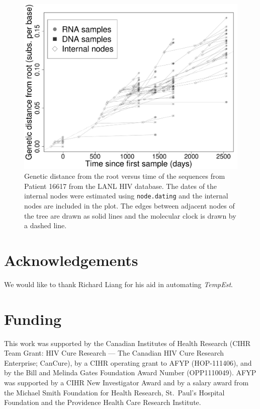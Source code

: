 \documentclass{bioinfo}
\newcommand{\code}[1]{{\tt #1}}
\begin{document}
\begin{figure}[t]
	\centering
	\includegraphics[width=\columnwidth]{Patient_16617_gray}
	\caption[Genetic distance versus time plot]{Genetic distance from the root versus time of the sequences from Patient 16617 from the LANL HIV database. The dates of the internal nodes were estimated using \code{node.dating} and the internal nodes are included in the plot. The edges between adjacent nodes of the tree are drawn as solid lines and the molecular clock is drawn by a dashed line.}
	\label{fig:pat16617}
\end{figure}


\section*{Acknowledgements} \label{sec:ackn}
We would like to thank Richard Liang for his aid in automating \emph{TempEst}.

\section*{Funding} \label{sec:fund}
This work was supported by the Canadian Institutes of Health Research (CIHR Team Grant: HIV Cure Research --- The Canadian HIV Cure Research Enterprise; CanCure), by a CIHR operating grant to AFYP (HOP-111406), and by the Bill and Melinda Gates Foundation Award Number (OPP1110049).
AFYP was supported by a CIHR New Investigator Award and by a salary award from the Michael Smith Foundation for Health Research, St.~Paul's Hospital Foundation and the Providence Health Care Research Institute.



\end{document}
